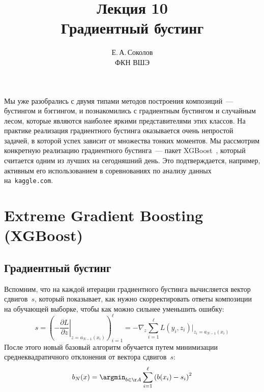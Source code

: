 \documentclass[12pt,fleqn]{article}
\begin{document}
\title{Лекция 10\\Градиентный бустинг}
\author{Е.\,А.\,Соколов\\ФКН ВШЭ}
\maketitle

Мы уже разобрались с двумя типами методов построения композиций~--- бустингом и бэггингом,
и познакомились с градиентным бустингом и случайным лесом, которые являются наиболее яркими
представителями этих классов.
На практике реализация градиентного бустинга оказывается очень непростой задачей,
в которой успех зависит от множества тонких моментов.
Мы рассмотрим конкретную реализацию градиентного бустинга~--- пакет XGBoost~\cite{chen16xgboost},
который считается одним из лучших на сегодняшний день.
Это подтверждается, например, активным его использованием в соревнованиях по анализу данных на~\texttt{kaggle.com}.

\section{Extreme Gradient Boosting (XGBoost)}
\subsection{Градиентный бустинг}
Вспомним, что на каждой итерации градиентного бустинга вычисляется вектор сдвигов~$s$,
который показывает, как нужно скорректировать ответы композиции на обучающей выборке,
чтобы как можно сильнее уменьшить ошибку:
\begin{equation}
\label{eq:gbm}
    s
    =
    \left(
        -\left.
        \frac{\partial L}{\partial z}
        \right|_{z = a_{N - 1}(x_i)}
    \right)_{i = 1}^{\ell}
    =
    -\nabla_z
    \sum_{i = 1}^{\ell}
        L(y_i, z_i)
    \Big|_{z_i = a_{N - 1}(x_i)}
\end{equation}
После этого новый базовый алгоритм обучается путем минимизации среднеквадратичного отклонения
от вектора сдвигов~$s$:
\[
    b_N(x)
    =
    \argmin_{b \in \AA}
        \sum_{i = 1}^{\ell}
            \left(
                b(x_i) - s_i
            \right)^2
\]
\end{document}
